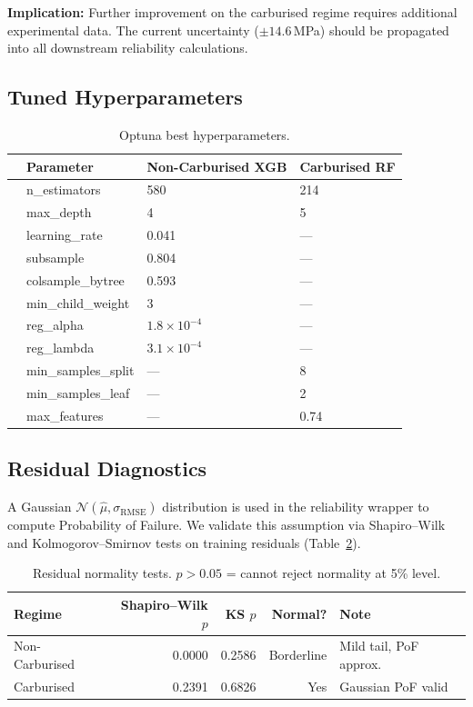 \documentclass[12pt,a4paper]{article}
\begin{document}
\textbf{Implication:} Further improvement on the carburised regime requires additional experimental
data. The current uncertainty ($\pm 14.6$\,MPa) should be propagated into all downstream
reliability calculations.

\subsection{Tuned Hyperparameters}

\begin{table}[H]
  \centering
  \caption{Optuna best hyperparameters.}
  \label{tab:hparams}
  \begin{tabular}{llll}
    \toprule
    & \textbf{Parameter} & \textbf{Non-Carburised XGB} & \textbf{Carburised RF} \\
    \midrule
    & n\_estimators     & 580    & 214 \\
    & max\_depth        & 4      & 5 \\
    & learning\_rate    & 0.041  & --- \\
    & subsample         & 0.804  & --- \\
    & colsample\_bytree & 0.593  & --- \\
    & min\_child\_weight & 3     & --- \\
    & reg\_alpha        & $1.8\times10^{-4}$ & --- \\
    & reg\_lambda       & $3.1\times10^{-4}$ & --- \\
    & min\_samples\_split & ---  & 8 \\
    & min\_samples\_leaf  & ---  & 2 \\
    & max\_features       & ---  & 0.74 \\
    \bottomrule
  \end{tabular}
\end{table}

\subsection{Residual Diagnostics}

A Gaussian $\mathcal{N}(\hat{\mu}, \sigma_{\text{RMSE}})$ distribution is used in the reliability
wrapper to compute Probability of Failure. We validate this assumption via Shapiro--Wilk and
Kolmogorov--Smirnov tests on training residuals (Table~\ref{tab:residuals}).

\begin{table}[H]
  \centering
  \caption{Residual normality tests. $p > 0.05$ = cannot reject normality at 5\% level.}
  \label{tab:residuals}
  \begin{tabular}{lrrrl}
    \toprule
    \textbf{Regime} & \textbf{Shapiro--Wilk $p$} & \textbf{KS $p$} & \textbf{Normal?} & \textbf{Note} \\
    \midrule
    Non-Carburised & 0.0000 & 0.2586 & Borderline & Mild tail, PoF approx. \\
    Carburised     & 0.2391 & 0.6826 & Yes        & Gaussian PoF valid \\
    \bottomrule
  \end{tabular}
\end{table}
\end{document}
